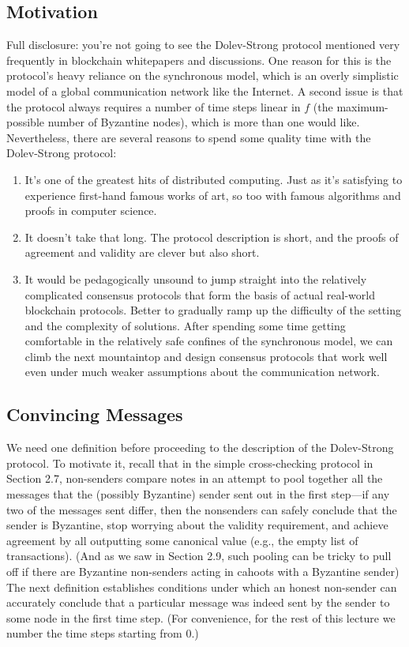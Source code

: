 \subsection{Motivation}
Full disclosure: you’re not going to see the Dolev-Strong protocol mentioned very frequently
in blockchain whitepapers and discussions. One reason for this is the protocol’s heavy reliance
on the synchronous model, which is an overly simplistic model of a global communication
network like the Internet. A second issue is that the protocol always requires a number of
time steps linear in $f$ (the maximum-possible number of Byzantine nodes), which is more
than one would like.\\
Nevertheless, there are several reasons to spend some quality time with the Dolev-Strong
protocol:
\begin{enumerate}
    \item It’s one of the greatest hits of distributed computing. Just as it’s satisfying to experience first-hand famous works of art, so too with famous algorithms and proofs in
computer science.
    \item It doesn’t take that long. The protocol description is short, and the proofs of agreement
and validity are clever but also short.
    \item It would be pedagogically unsound to jump straight into the relatively complicated
consensus protocols that form the basis of actual real-world blockchain protocols. Better to gradually ramp up the difficulty of the setting and the complexity of solutions.
After spending some time getting comfortable in the relatively safe confines of the
synchronous model, we can climb the next mountaintop and design consensus protocols that work well even under much weaker assumptions about the communication
network.
\end{enumerate}

\subsection{Convincing Messages}
We need one definition before proceeding to the description of the Dolev-Strong protocol.
To motivate it, recall that in the simple cross-checking protocol in Section 2.7, non-senders
compare notes in an attempt to pool together all the messages that the (possibly Byzantine)
sender sent out in the first step—if any two of the messages sent differ, then the nonsenders can safely conclude that the sender is Byzantine, stop worrying about the validity
requirement, and achieve agreement by all outputting some canonical value (e.g., the empty
list of transactions). (And as we saw in Section 2.9, such pooling can be tricky to pull off
if there are Byzantine non-senders acting in cahoots with a Byzantine sender) The next
definition establishes conditions under which an honest non-sender can accurately conclude
that a particular message was indeed sent by the sender to some node in the first time step.
(For convenience, for the rest of this lecture we number the time steps starting from 0.)

